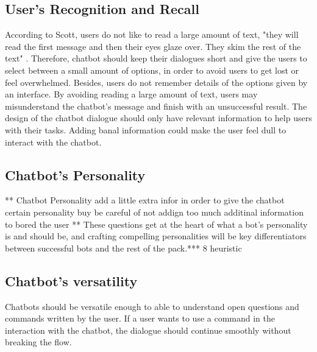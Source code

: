 \documentclass[a4paper,10pt]{article}
\begin{document}
\subsection*{User's Recognition and Recall}

According to Scott, users do not like to read a large amount of text, "they will read the first message and then their eyes glaze over. They skim the rest of the text" \cite{HeuristicsWebPage}. Therefore, chatbot should keep their dialogues short and give the users to select between a small amount of options, in order to avoid users to get lost or feel overwhelmed. Besides, users do not remember details of the options given by an interface. By avoiding reading a large amount of text, users may misunderstand the chatbot's message and finish with an unsuccessful result. The design of the chatbot dialogue should only have relevant information to help users with their tasks. Adding banal information could make the user feel dull to interact with the chatbot. 

\subsection*{Chatbot's Personality}

** Chatbot Personality add a little extra infor in order to give the chatbot certain personality buy be careful of not addign too much additinal information to bored the user ** These questions get at the heart of what a bot’s personality is and should be, and crafting compelling personalities will be key differentiators between successful bots and the rest of the pack.*** 8 heuristic

\subsection*{Chatbot's versatility}

Chatbots should be versatile enough to able to understand open questions and commands written by the user. If a user wants to use a command in the interaction with the chatbot, the dialogue should continue smoothly without breaking the flow.

\medskip


\end{document}
